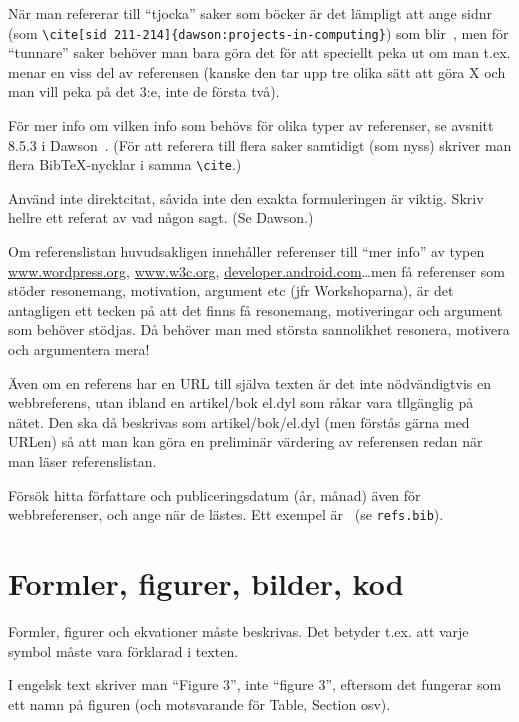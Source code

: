 \documentclass[a4paper,12pt]{article}
\begin{document}
När man refererar till ``tjocka'' saker som böcker är det lämpligt att ange sidnr 
(som \verb|\cite[sid 211-214]{dawson:projects-in-computing}|) som blir~\cite[sid 211-214]{dawson:projects-in-computing}, men för ``tunnare'' saker behöver man bara göra det för att speciellt peka ut om man t.ex. menar en viss del av referensen (kanske den tar upp tre olika sätt att göra X och man vill peka på det 3:e, inte de första två).

För mer info om vilken info som behövs för olika typer av referenser, se avsnitt 8.5.3 i Dawson~\cite{dawson:projects-in-computing,dawson:projects-in-computing-old}. (För att referera till flera saker samtidigt (som nyss) skriver man flera BibTeX-nycklar i samma \verb|\cite|.)

Använd inte direktcitat, såvida inte den exakta formuleringen är viktig.  Skriv hellre ett referat av vad någon sagt. (Se Dawson.)

Om referenslistan huvudsakligen innehåller referenser till ``mer info'' av typen 
\url{www.wordpress.org}, \url{www.w3c.org}, \url{developer.android.com}\ldots men få referenser som stöder resonemang, motivation, argument etc (jfr Workshoparna), är det antagligen ett tecken på att det finns få resonemang, motiveringar och argument som behöver stödjas. Då behöver man med största sannolikhet resonera, motivera och argumentera mera!

Även om en referens har en URL till själva texten är det inte nödvändigtvis en webbreferens, utan ibland en artikel/bok el.dyl som råkar vara tllgänglig på nätet. Den ska då beskrivas som artikel/bok/el.dyl (men förstås gärna med URLen) så att man kan göra en preliminär värdering av referensen redan när man läser referenslistan.

Försök hitta författare och publiceringsdatum (år, månad) även för webbreferenser, och ange när de lästes. Ett exempel är~\cite{berners-lee:cool-uris} (se \texttt{refs.bib}).



\section{Formler, figurer, bilder, kod}
\label{sec:forml-figur-bild}

Formler, figurer och ekvationer måste beskrivas.  Det betyder t.ex. att varje symbol måste vara förklarad i texten.

I engelsk text skriver man ``Figure 3'', inte ``figure 3'', eftersom det fungerar som ett namn på figuren (och motsvarande för Table, Section osv).
\end{document}
